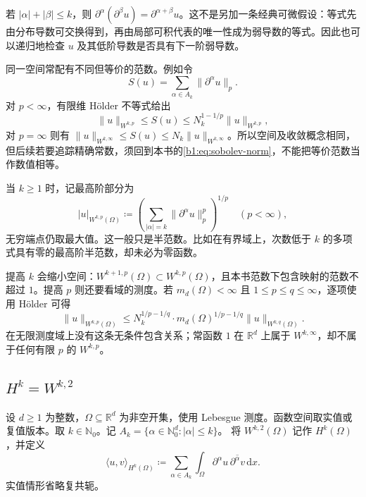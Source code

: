 \ProseParagraphBreak

若 \(|\alpha|+|\beta|\le k\)，则 \(\partial^\alpha(\partial^\beta u)=\partial^{\alpha+\beta}u\)。这不是另加一条经典可微假设：等式先由分布导数可交换得到，再由局部可积代表的唯一性成为弱导数的等式。因此也可以递归地检查 \(u\) 及其低阶导数是否具有下一阶弱导数。

\ProseParagraphBreak

同一空间常配有不同但等价的范数。例如令
\[
 S(u)=\sum_{\alpha\in A_k}\|\partial^\alpha u\|_p.
\]
对 \(p<\infty\)，有限维 Hölder 不等式给出
\[
 \|u\|_{W^{k,p}}\le S(u)
 \le N_k^{1-1/p}\|u\|_{W^{k,p}},
\]
对 \(p=\infty\) 则有 \(\|u\|_{W^{k,\infty}}\le S(u)\le N_k\|u\|_{W^{k,\infty}}\)。所以空间及收敛概念相同，但后续若要追踪精确常数，须回到本书的\eqref{b1:eq:sobolev-norm}，不能把等价范数当作数值相等。

\ProseParagraphBreak

当 \(k\ge1\) 时，记最高阶部分为
\[
 |u|_{W^{k,p}(\Omega)}
 \coloneqq\left(\sum_{|\alpha|=k}\|\partial^\alpha u\|_p^p\right)^{1/p}
 \quad(p<\infty),
\]
无穷端点仍取最大值。这一般只是半范数。比如在有界域上，次数低于 \(k\) 的多项式具有零的最高阶半范数，却未必为零函数。

\ProseParagraphBreak

提高 \(k\) 会缩小空间：\(W^{k+1,p}(\Omega)\subset W^{k,p}(\Omega)\)，且本书范数下包含映射的范数不超过 \(1\)。提高 \(p\) 则还要看域的测度。若 \(m_d(\Omega)<\infty\) 且 \(1\le p\le q\le\infty\)，逐项使用 Hölder 可得
\[
 \|u\|_{W^{k,p}(\Omega)}
 \le N_k^{1/p-1/q}\cdot m_d(\Omega)^{1/p-1/q}
       \|u\|_{W^{k,q}(\Omega)}.
\]
在无限测度域上没有这条无条件包含关系；常函数 \(1\) 在 \(\mathbb R^d\) 上属于 \(W^{k,\infty}\)，却不属于任何有限 \(p\) 的 \(W^{k,p}\)。

\subsection{\texorpdfstring{\(H^k=W^{k,2}\)}{Hk=Wk,2}}
\label{b1:subsec:210103}

\begin{definition}\label{b1:def:sobolev-hilbert}
设 \(d\geq1\) 为整数，\(\Omega\subseteq\mathbb R^d\) 为非空开集，使用 Lebesgue 测度。函数空间取实值或复值版本。取 \(k\in\mathbb N_0\)。记 \(A_k=\{\alpha\in\mathbb N_0^d:|\alpha|\leq k\}\)。
将 \(W^{k,2}(\Omega)\) 记作 \(H^k(\Omega)\)，并定义
\begin{equation}\label{b1:eq:sobolev-inner-product}
 \langle u,v\rangle_{H^k(\Omega)}
 \coloneqq\sum_{\alpha\in A_k}\int_\Omega
       \partial^\alpha u\,\overline{\partial^\alpha v}\,\mathrm dx.
\end{equation}
实值情形省略复共轭。
\end{definition}

